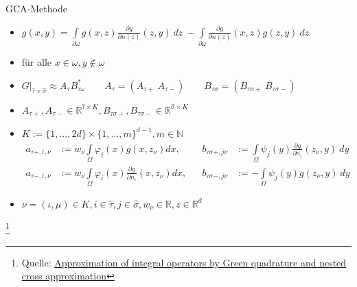 \documentclass[10pt]{beamer}
\let\svthefootnote\thefootnote
\begin{document}
\begin{frame}{GCA-Methode}
  \begin{overprint}
        \begin{itemize}
          \item \(g(x, y) = \int\limits_{\partial \omega} g(x, z)
                  \frac{\partial g}{\partial n(z)}(z, y) \ dz \ -
                  \int\limits_{\partial \omega}
                  \frac{\partial g}{\partial n(z)}(x, z) g(z, y) \ dz\)
          \item[] \hfil für alle \(x \in \omega, y \notin \omega\)
        \end{itemize}
        \begin{itemize}
          \item \(G|_{\hat{\tau} \times \hat{\sigma}} \approx A_{\tau}
                  B_{\tau\omega}^{*} \qquad A_{\tau} = (A_{\tau+} \ A_{\tau-})
                  \qquad B_{\tau\sigma} = (B_{\tau\sigma+} \ B_{\tau\sigma-})\)
          \item[] \hfil \(A_{\tau+}, A_{\tau-} \in \mathbb{R}^{\hat{\tau}
                  \times K}, B_{\tau\sigma+}, B_{\tau\sigma-} \in
                  \mathbb{R}^{\hat{\sigma} \times K}\)
          \item[] \hfil \(K := \{1, \hdots, 2d \} \times \{1, \hdots, m\}^{d-1},
                  m \in \mathbb{N}\)
          \begin{align*}
            a_{\tau+, i, \nu} &:= w_{\nu} \int\limits_{\Omega} \varphi_{i}(x)
                                  g(x, z_{\nu}) dx, && b_{\tau\sigma+, j\nu} &:=
                                  \int\limits_{\Omega} \psi_{j}(y)
                                  \frac{\partial g}{\partial n_{\iota}}
                                  (z_{\nu}, y) \ dy \\
            a_{\tau-, i, \nu} &:= w_{\nu} \int\limits_{\Omega} \varphi_{i}(x)
                                  \frac{\partial g}{\partial n_{\iota}}
                                  (x, z_{\nu}) dx, && b_{\tau\sigma-, j\nu} &:=
                                  -\int\limits_{\Omega} \psi_{j}(y)
                                  g(z_{\nu}, y) \ dy
          \end{align*}
          \item[] \hfil \(\nu = (\iota, \mu) \in K, i \in \hat{\tau}, j \in
                          \hat{\sigma}, w_{\nu} \in \mathbb{R}, z \in
                          \mathbb{R}^{d}\)
        \end{itemize}
  \end{overprint}

  \footnotesize
  \let\thefootnote\relax\footnote{Quelle: \href{https://link.springer.com/article/10.1007\%2Fs00211-015-0757-y}{Approximation of integral operators by Green quadrature and nested cross approximation}}
  \addtocounter{footnote}{-1}\let\thefootnote\svthefootnote\relax
  \normalsize
\end{frame}
\end{document}
